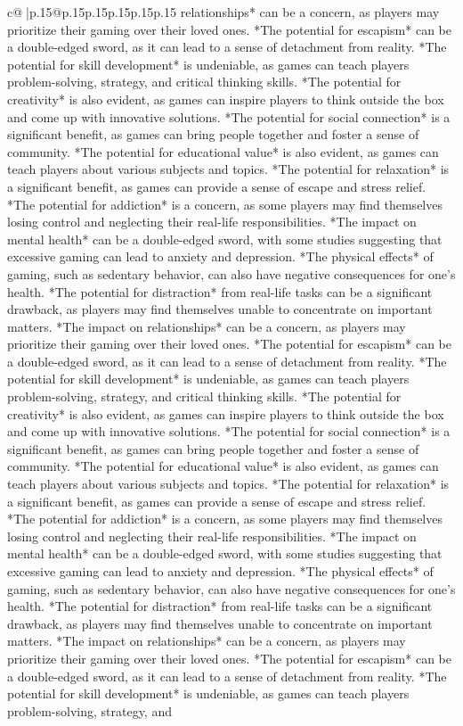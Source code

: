 \documentclass{article}
\begin{document}
{\begin{supertabular}{c@{$\;$}|p{.15\linewidth}@{}p{.15\linewidth}p{.15\linewidth}p{.15\linewidth}p{.15\linewidth}p{.15\linewidth}}
{{{relationships* can be a concern, as players may prioritize their gaming over their loved ones. *The potential for escapism* can be a double{-}edged sword, as it can lead to a sense of detachment from reality. *The potential for skill development* is undeniable, as games can teach players problem{-}solving, strategy, and critical thinking skills. *The potential for creativity* is also evident, as games can inspire players to think outside the box and come up with innovative solutions. *The potential for social connection* is a significant benefit, as games can bring people together and foster a sense of community. *The potential for educational value* is also evident, as games can teach players about various subjects and topics. *The potential for relaxation* is a significant benefit, as games can provide a sense of escape and stress relief. *The potential for addiction* is a concern, as some players may find themselves losing control and neglecting their real{-}life responsibilities. *The impact on mental health* can be a double{-}edged sword, with some studies suggesting that excessive gaming can lead to anxiety and depression. *The physical effects* of gaming, such as sedentary behavior, can also have negative consequences for one's health. *The potential for distraction* from real{-}life tasks can be a significant drawback, as players may find themselves unable to concentrate on important matters. *The impact on relationships* can be a concern, as players may prioritize their gaming over their loved ones. *The potential for escapism* can be a double{-}edged sword, as it can lead to a sense of detachment from reality. *The potential for skill development* is undeniable, as games can teach players problem{-}solving, strategy, and critical thinking skills. *The potential for creativity* is also evident, as games can inspire players to think outside the box and come up with innovative solutions. *The potential for social connection* is a significant benefit, as games can bring people together and foster a sense of community. *The potential for educational value* is also evident, as games can teach players about various subjects and topics. *The potential for relaxation* is a significant benefit, as games can provide a sense of escape and stress relief. *The potential for addiction* is a concern, as some players may find themselves losing control and neglecting their real{-}life responsibilities. *The impact on mental health* can be a double{-}edged sword, with some studies suggesting that excessive gaming can lead to anxiety and depression. *The physical effects* of gaming, such as sedentary behavior, can also have negative consequences for one's health. *The potential for distraction* from real{-}life tasks can be a significant drawback, as players may find themselves unable to concentrate on important matters. *The impact on relationships* can be a concern, as players may prioritize their gaming over their loved ones. *The potential for escapism* can be a double{-}edged sword, as it can lead to a sense of detachment from reality. *The potential for skill development* is undeniable, as games can teach players problem{-}solving, strategy, and }}}
\end{supertabular}}
\end{document}
